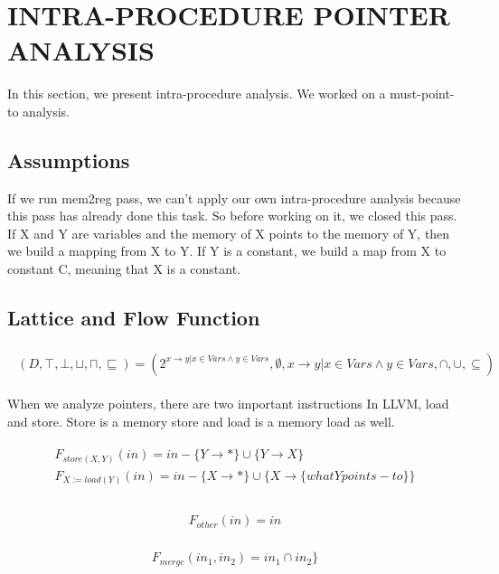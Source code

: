 \section{INTRA-PROCEDURE POINTER ANALYSIS}
In this section, we present intra-procedure analysis. We worked on a must-point-to analysis.

\subsection{Assumptions}
If we run mem2reg pass, we can't apply our own intra-procedure analysis because this pass has already done this task. So before working on it, we closed this pass. If X and Y are variables and the memory of X points to the memory of Y, then we build a mapping from X to Y. If Y is a constant, we build a map from X to constant C, meaning that X is a constant.

\subsection{Lattice and Flow Function}
\begin{align} 
	\begin{split}
		(D, \top, \bot, \sqcup, \sqcap, \sqsubseteq) = (2^{x \to y | x \in Vars \wedge y \in Vars}, \emptyset, x \to y | x \in Vars \wedge y \in Vars, \cap, \cup, \subseteq)
	\end{split}
\end{align}

When we analyze pointers, there are two important instructions In LLVM, load and store.  Store is a memory store and load is a memory load as well.

\begin{align} 
	\begin{split}
		F_{store(X, Y)}(in) = in  - \{Y \to *\}\cup \{ Y \to X\}  \\
		F_{X := load(Y)}(in) = in  - \{X \to *\}\cup \{ X \to \{what Y points-to\}\} \\
	\end{split}
\end{align}

\begin{align} 
	\begin{split}
		F_{other}(in) = in
	\end{split}
\end{align}

\begin{align} 
	\begin{split}
		F_{merge}(in_1, in_2) = in_1 \cap in_2\}
	\end{split}
\end{align}

